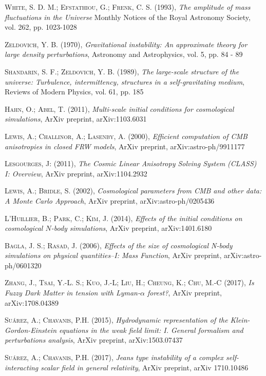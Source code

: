\documentclass[a4paper,openright,10pt, oneside, final]{book}
\begin{document}
\begin{thebibliography}{a}
 \textsc{White, S. D. M.; Efstathiou, G.; Frenk, C. S. (1993)},
\textit{The amplitude of mass fluctuations in the Universe}
Monthly Notices of the Royal Astronomy Society, vol. 262, pp. 1023-1028

 \textsc{Zeldovich, Y. B. (1970)},
\textit{Gravitational instability: An approximate theory for large density perturbations},
Astronomy and Astrophysics, vol. 5, pp. 84 - 89

 \textsc{Shandarin, S. F.; Zeldovich, Y. B. (1989)},
\textit{The large-scale structure of the universe: Turbulence, intermittency, structures in a self-gravitating medium},
Reviews of Modern Physics, vol. 61, pp. 185

 \textsc{Hahn, O.; Abel, T. (2011)},
\textit{Multi-scale initial conditions for cosmological simulations},
ArXiv preprint, arXiv:1103.6031

 \textsc{Lewis, A.; Challinor, A.; Lasenby, A. (2000)},
\textit{Efficient computation of CMB anisotropies in closed FRW models},
ArXiv preprint, arXiv:astro-ph/9911177

 \textsc{Lesgourges, J: (2011)}, 
\textit{The Cosmic Linear Anisotropy Solving System (CLASS) I: Overview},
ArXiv preprint, arXiv:1104.2932

 \textsc{Lewis, A.; Bridle, S. (2002)},
\textit{Cosmological parameters from CMB and other data: A Monte Carlo Approach},
ArXiv preprint, arXiv:astro-ph/0205436

 \textsc{L'Huillier, B.; Park, C.; Kim, J. (2014)},
\textit{Effects of the initial conditions on cosmological $N$-body simulations},
ArXiv preprint, arXiv:1401.6180

 \textsc{Bagla, J. S.; Rasad, J. (2006)},
\textit{Effects of the size of cosmological N-body simulations on physical quantities--I: Mass Function},
ArXiv preprint, arXiv:astro-ph/0601320

 \textsc{Zhang, J., Tsai, Y.-L. S.; Kuo, J.-L; Liu, H.; Cheung, K.; Chu, M.-C (2017)},
\textit{Is Fuzzy Dark Matter in tension with Lyman-$\alpha$ forest?},
ArXiv preprint, arXiv:1708.04389

 \textsc{Suárez, A.; Chavanis, P.H. (2015)},
\textit{Hydrodynamic representation of the Klein-Gordon-Einstein equations
in the weak field limit:  I. General formalism and perturbations analysis},
ArXiv preprint, arXiv:1503.07437

 \textsc{Suárez, A.; Chavanis, P.H. (2017)},
\textit{Jeans type instability of a complex self-interacting scalar field in general relativity},
ArXiv preprint, arXiv 1710.10486



\end{thebibliography}
\end{document}
